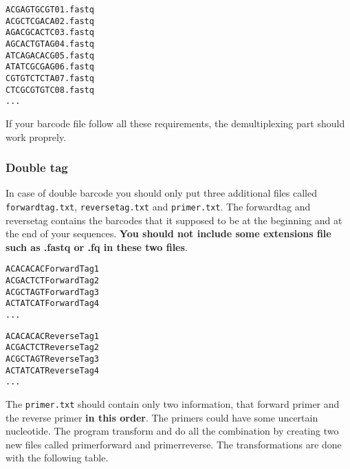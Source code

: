 \documentclass{article}\usepackage[]{graphicx}\usepackage[]{color}
\makeatletter
\newenvironment{kframe}{%
 \def\at@end@of@kframe{}%
 \ifinner\ifhmode%
  \def\at@end@of@kframe{\end{minipage}}%
  \begin{minipage}{\columnwidth}%
 \fi\fi%
 \def\FrameCommand##1{\hskip\@totalleftmargin \hskip-\fboxsep
 \colorbox{shadecolor}{##1}\hskip-\fboxsep
     \hskip-\linewidth \hskip-\@totalleftmargin \hskip\columnwidth}%
 \MakeFramed {\advance\hsize-\width
   \@totalleftmargin\z@ \linewidth\hsize
   \@setminipage}}%
 {\par\unskip\endMakeFramed%
 \at@end@of@kframe}
\newenvironment{knitrout}{}{} %
\makeatother
\begin{document}
\begin{knitrout}
\color{fgcolor}\begin{kframe}
\begin{alltt}
ACGAGTGCGT	01.fastq
ACGCTCGACA	02.fastq
AGACGCACTC	03.fastq
AGCACTGTAG	04.fastq
ATCAGACACG	05.fastq
ATATCGCGAG	06.fastq
CGTGTCTCTA	07.fastq
CTCGCGTGTC	08.fastq
...
\end{alltt}
\end{kframe}
\end{knitrout}

If your barcode file follow all these requirements, the demultiplexing part should work proprely.

\subsubsection{Double tag}
 In case of double barcode you should only put three additional files called \texttt{forwardtag.txt},
 \texttt{reversetag.txt} and \texttt{primer.txt}. The forwardtag and reversetag contains the barcodes that it supposed to be at the beginning and at the end of your sequences. \textbf{You should not include some extensions file such as .fastq or .fq in these two files}.


\begin{knitrout}
\color{fgcolor}\begin{kframe}
\begin{alltt}
ACACACAC	ForwardTag1
ACGACTCT	ForwardTag2
ACGCTAGT	ForwardTag3
ACTATCAT	ForwardTag4
...
\end{alltt}
\end{kframe}
\end{knitrout}

\begin{knitrout}
\color{fgcolor}\begin{kframe}
\begin{alltt}
ACACACAC	ReverseTag1
ACGACTCT	ReverseTag2
ACGCTAGT	ReverseTag3
ACTATCAT	ReverseTag4
...
\end{alltt}
\end{kframe}
\end{knitrout}


The \texttt{primer.txt} should contain only two information, that forward primer and the reverse primer \textbf{in this order}.
The primers could have some uncertain nucleotide. The program transform and do all the combination by creating two new files called primerforward and primerreverse. The transformations are done with the following table.
\end{document}
